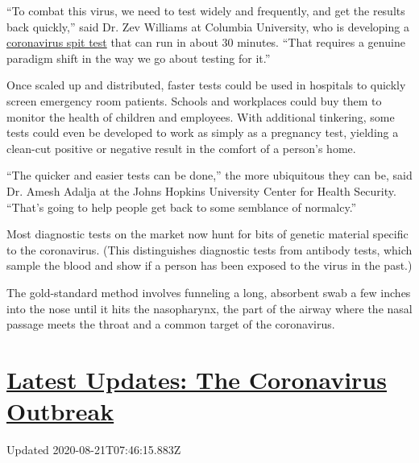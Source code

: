 ``To combat this virus, we need to test widely and frequently, and get
the results back quickly,'' said Dr. Zev Williams at Columbia
University, who is developing a
\href{https://www.medrxiv.org/content/10.1101/2020.06.13.20129841v1.full.pdf}{coronavirus
spit test} that can run in about 30 minutes. ``That requires a genuine
paradigm shift in the way we go about testing for it.''

Once scaled up and distributed, faster tests could be used in hospitals
to quickly screen emergency room patients. Schools and workplaces could
buy them to monitor the health of children and employees. With
additional tinkering, some tests could even be developed to work as
simply as a pregnancy test, yielding a clean-cut positive or negative
result in the comfort of a person's home.

``The quicker and easier tests can be done,'' the more ubiquitous they
can be, said Dr. Amesh Adalja at the Johns Hopkins University Center for
Health Security. ``That's going to help people get back to some
semblance of normalcy.''

Most diagnostic tests on the market now hunt for bits of genetic
material specific to the coronavirus. (This distinguishes diagnostic
tests from antibody tests, which sample the blood and show if a person
has been exposed to the virus in the past.)

The gold-standard method involves funneling a long, absorbent swab a few
inches into the nose until it hits the nasopharynx, the part of the
airway where the nasal passage meets the throat and a common target of
the coronavirus.

\hypertarget{latest-updates-the-coronavirus-outbreak}{%
\section{\texorpdfstring{\href{https://www.nytimes3xbfgragh.onion/2020/08/20/world/coronavirus-covid.html?action=click\&pgtype=Article\&state=default\&region=MAIN_CONTENT_1\&context=storylines_live_updates}{Latest
Updates: The Coronavirus
Outbreak}}{Latest Updates: The Coronavirus Outbreak}}\label{latest-updates-the-coronavirus-outbreak}}

Updated 2020-08-21T07:46:15.883Z

